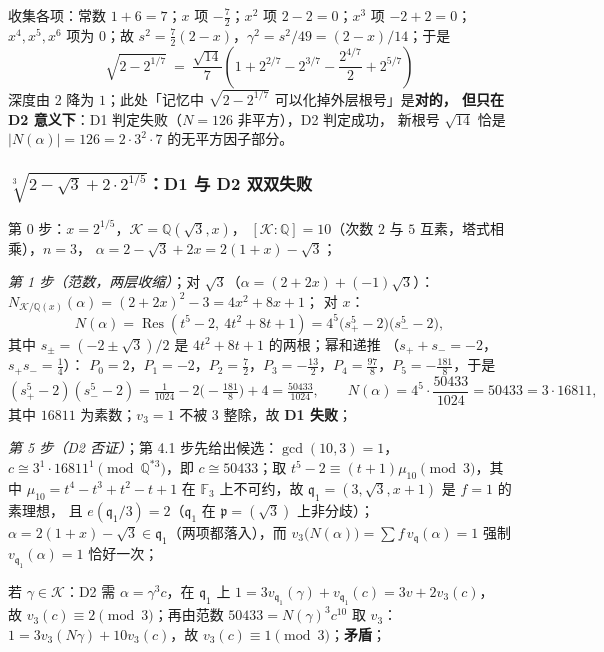 \documentclass[UTF8,a4paper,11pt]{ctexart}
\begin{document}
收集各项：常数 $1+6=7$；$x$ 项 $-\tfrac72$；$x^2$ 项 $2-2=0$；$x^3$ 项 $-2+2=0$；
$x^4,x^5,x^6$ 项为 $0$；故 $s^2=\tfrac72(2-x)$，$\gamma^2=s^2/49=(2-x)/14$；于是
\[
\boxed{\ \sqrt{2-2^{1/7}}\ =\ \frac{\sqrt{14}}{7}
\left(1+2^{2/7}-2^{3/7}-\frac{2^{4/7}}{2}+2^{5/7}\right)\ }
\]
深度由 $2$ 降为 $1$；此处「记忆中 $\sqrt{2-2^{1/7}}$ 可以化掉外层根号」是\textbf{对的，
但只在 D2 意义下}：D1 判定失败（$N=126$ 非平方），D2 判定成功，
新根号 $\sqrt{14}$ 恰是 $|N(\alpha)|=126=2\cdot3^2\cdot7$ 的无平方因子部分。\par

\subsubsection{$\sqrt[3]{2-\sqrt3+2\cdot2^{1/5}}$：D1 与 D2 双双失败}
\label{ex:double-no-1}

第 0 步：$x=2^{1/5}$，$\mathscr{K}=\mathbb{Q}(\sqrt3,x)$，
$[\mathscr{K}:\mathbb{Q}]=10$（次数 $2$ 与 $5$ 互素，塔式相乘），$n=3$，
$\alpha=2-\sqrt3+2x=2(1+x)-\sqrt3$；\par

\emph{第 1 步（范数，两层收缩）}；对 $\sqrt3$（$\alpha=(2+2x)+(-1)\sqrt3$）：
$N_{\mathscr{K}/\mathbb{Q}(x)}(\alpha)=(2+2x)^2-3=4x^2+8x+1$；
对 $x$：
\[
N(\alpha)=\operatorname{Res}(t^5-2,\ 4t^2+8t+1)
=4^5\bigl(s_+^5-2\bigr)\bigl(s_-^5-2\bigr),
\]
其中 $s_\pm=(-2\pm\sqrt3)/2$ 是 $4t^2+8t+1$ 的两根；幂和递推
（$s_++s_-=-2$，$s_+s_-=\tfrac14$）：
$P_0=2$，$P_1=-2$，$P_2=\tfrac72$，$P_3=-\tfrac{13}2$，$P_4=\tfrac{97}8$，$P_5=-\tfrac{181}8$，于是
\[
(s_+^5-2)(s_-^5-2)=\tfrac1{1024}-2\bigl(-\tfrac{181}8\bigr)+4=\tfrac{50433}{1024},
\qquad
N(\alpha)=4^5\cdot\frac{50433}{1024}=50433=3\cdot16811 ,
\]
其中 $16811$ 为素数；$v_3=1$ 不被 $3$ 整除，故 \textbf{D1 失败}；\par

\emph{第 5 步（D2 否证）}；第 4.1 步先给出候选：$\gcd(10,3)=1$，
$c\cong3^{1}\cdot16811^{1}\pmod{\mathbb{Q}^{*3}}$，即 $c\cong50433$；取
$t^5-2\equiv(t+1)\mu_{10}\pmod3$，其中 $\mu_{10}=t^4-t^3+t^2-t+1$ 在
$\mathbb{F}_3$ 上不可约，故 $\mathfrak{q}_1=(3,\sqrt3,x+1)$ 是 $f=1$ 的素理想，
且 $e(\mathfrak{q}_1/3)=2$（$\mathfrak{q}_1$ 在 $\mathfrak{p}=(\sqrt3)$ 上非分歧）；
$\alpha=2(1+x)-\sqrt3\in\mathfrak{q}_1$（两项都落入），而
$v_3\bigl(N(\alpha)\bigr)=\sum f\,v_{\mathfrak{q}}(\alpha)=1$ 强制
$v_{\mathfrak{q}_1}(\alpha)=1$ 恰好一次；\par

若 $\gamma\in\mathscr{K}$：D2 需 $\alpha=\gamma^3c$，在 $\mathfrak{q}_1$ 上
$1=3v_{\mathfrak{q}_1}(\gamma)+v_{\mathfrak{q}_1}(c)=3v+2v_3(c)$，
故 $v_3(c)\equiv2\pmod3$；再由范数 $50433=N(\gamma)^3c^{10}$ 取 $v_3$：
$1=3v_3(N\gamma)+10v_3(c)$，故 $v_3(c)\equiv1\pmod3$；\textbf{矛盾}；\par
\end{document}
